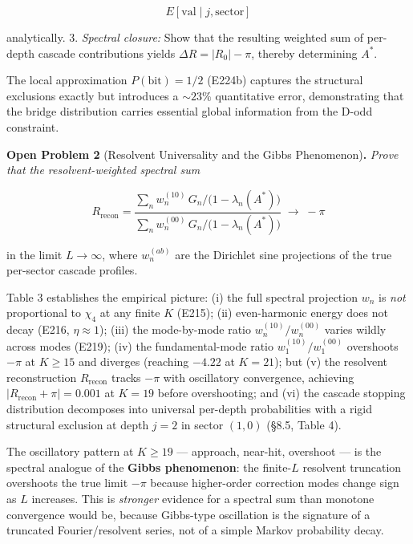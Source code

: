 \documentclass[
  11pt,
]{article}
\begin{document}
\[E[\mathrm{val} \mid j, \mathrm{sector}]\]

analytically. 3. \emph{Spectral closure:} Show that the resulting weighted sum
of per-depth cascade contributions yields \(\Delta R = |R_0| - \pi\), thereby
determining \(A^{\ast}\).

The local approximation \(P(\mathrm{bit}) = 1/2\) (E224b) captures the
structural exclusions exactly but introduces a \(\sim 23\%\) quantitative error,
demonstrating that the bridge distribution carries essential global information
from the D-odd constraint.

\textbf{Open Problem 2} (Resolvent Universality and the Gibbs
Phenomenon)\textbf{.} \emph{Prove that the resolvent-weighted spectral sum}

\[R_{\mathrm{recon}} = \frac{\sum_{n} w_{n}^{(10)} \, G_{n} / \bigl(1 - \lambda_{n}(A^{{\ast}})\bigr)}{\sum_{n} w_{n}^{(00)} \, G_{n} / \bigl(1 - \lambda_{n}(A^{{\ast}})\bigr)} \;\longrightarrow\; -\pi\]

in the limit \(L \to \infty\), where \(w_n^{(ab)}\) are the Dirichlet sine
projections of the true per-sector cascade profiles.

Table 3 establishes the empirical picture: (i) the full spectral projection
\(w_n\) is \emph{not} proportional to \(\chi_4\) at any finite \(K\) (E215);
(ii) even-harmonic energy does not decay (E216, \(\eta \approx 1\)); (iii) the
mode-by-mode ratio \(w_n^{(10)}/w_n^{(00)}\) varies wildly across modes (E219);
(iv) the fundamental-mode ratio \(w_1^{(10)}/w_1^{(00)}\) overshoots \(-\pi\) at
\(K \geq 15\) and diverges (reaching \(-4.22\) at \(K = 21\)); but (v) the
resolvent reconstruction \(R_{\mathrm{recon}}\) tracks \(-\pi\) with oscillatory
convergence, achieving \(|R_{\mathrm{recon}} + \pi| = 0.001\) at \(K = 19\)
before overshooting; and (vi) the cascade stopping distribution decomposes into
universal per-depth probabilities with a rigid structural exclusion at depth
\(j = 2\) in sector \((1,0)\) (§8.5, Table 4).

The oscillatory pattern at \(K \geq 19\) --- approach, near-hit, overshoot ---
is the spectral analogue of the \textbf{Gibbs phenomenon}: the finite-\(L\)
resolvent truncation overshoots the true limit \(-\pi\) because higher-order
correction modes change sign as \(L\) increases. This is \emph{stronger}
evidence for a spectral sum than monotone convergence would be, because
Gibbs-type oscillation is the signature of a truncated Fourier/resolvent series,
not of a simple Markov probability decay.
\end{document}
